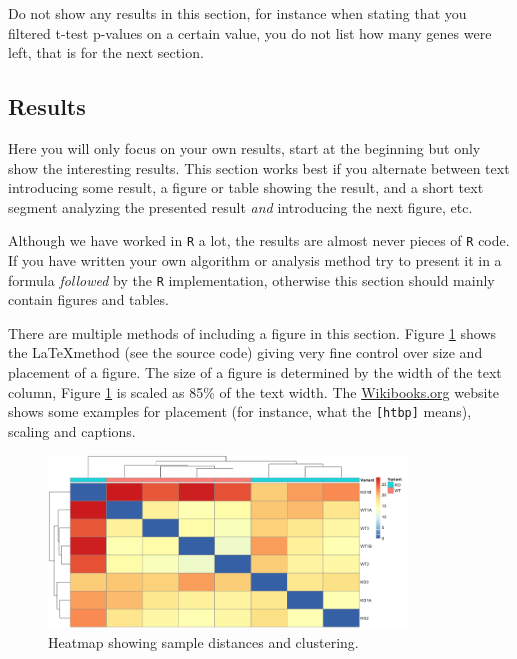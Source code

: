 Do not show any results in this section, for instance when stating that
you filtered t-test p-values on a certain value, you do not list how
many genes were left, that is for the next section.

\subsection{Results}\label{results}

Here you will only focus on your own results, start at the beginning but
only show the interesting results. This section works best if you
alternate between text introducing some result, a figure or table
showing the result, and a short text segment analyzing the presented
result \emph{and} introducing the next figure, etc.

Although we have worked in \texttt{R} a lot, the results are almost
never pieces of \texttt{R} code. If you have written your own algorithm
or analysis method try to present it in a formula \emph{followed} by the
\texttt{R} implementation, otherwise this section should mainly contain
figures and tables.

There are multiple methods of including a figure in this section. Figure
\ref{figure:sample_heatmap} shows the \LaTeX method (see the source
code) giving very fine control over size and placement of a figure. The
size of a figure is determined by the width of the text column, Figure
\ref{figure:sample_heatmap} is scaled as 85\% of the text width. The
\href{https://en.wikibooks.org/wiki/LaTeX/Floats,_Figures_and_Captions\#Figures}{Wikibooks.org}
website shows some examples for placement (for instance, what the
\texttt{{[}htbp{]}} means), scaling and captions.

\begin{figure}[htbp]
  \centering
  \includegraphics[width=0.85\textwidth]{images/pheatmap.png}
  \caption{Heatmap showing sample distances and clustering.}
  \label{figure:sample_heatmap}
\end{figure}

